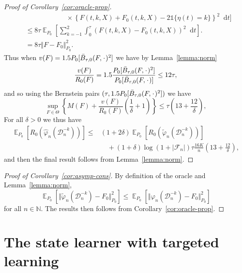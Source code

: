 \documentclass{statsoc}
\DeclareMathOperator{\E}{\mathbb{E}} %
\newcommand{\N}{\mathbb{N}}
\newcommand{\blank}{\makebox[1ex]{\textbf{$\cdot$}}}
\renewcommand{\phi}{\varphi}
\newcommand*\diff{\mathop{}\!\mathrm{d}}
\newcommand{\1}{\mathds{1}}
\newcommand{\data}{\ensuremath{\mathcal{D}}}
\begin{document}
\begin{proof}[Proof of Corollary~\ref{cor:oracle-prop}]
\begin{align*}
  & \quad \quad \quad\quad \quad \quad \times
    \left\{
    F(t, k, X) +  F_0(t, k, X)-2 \1{\{\eta(t) = k\}}
    \right\}^2
    \diff t 
    \Bigg]
  \\
  & \leq
    8\tau \E_{P_0}{\left[
    \sum_{k=-1}^{2} \int_0^{\tau}
    \left(
    F(t, k, X) - F_0(t, k, X)
    \right)^2
    \diff t 
    \right]}.
  \\
  & =
    8\tau \Vert F - F_0 \Vert_{P_0}^2.
\end{align*}
Thus when \( v(F) = 1.5 P_0{[\bar{B}_{\tau,0}(F, \blank)^2]} \) we have by
Lemma~\ref{lemma:norm}
\begin{equation*}
  \frac{v(F)}{R_0(F)}
  = 1.5 \frac{P_0{[\bar{B}_{\tau,0}(F, \blank)^2]}}{P_0{[\bar{B}_{\tau,0}(F, \blank)]}}
  \leq 12 \tau,
\end{equation*}
and so using the Bernstein pairs \( (\tau, 1.5 P_0{[\bar{B}_{\tau,0}(F, \blank)^2]}) \) we have
\begin{equation*}
  \sup_{F \in \Theta}
  \left\{
    M(F) + \frac{v(F)}{R_0(F)}
    \left(
      \frac{1}{\delta} + 1
    \right)
  \right\}
  \leq \tau
  \left(
    13 + \frac{12}{\delta}
  \right),
\end{equation*}
For all $\delta>0$ we thus have
\begin{align*}
  \E_{P_0}{\left[ R_0(\hat{\phi}_n(\data_n^{-k})) \right]}
  \leq
  &(1+2\delta)\E_{P_0}{\left[ R_0(\tilde{\phi}_n(\data_n^{-k})) \right]}
  \\
  & \quad
    + (1+\delta)\log(1 + |\mathcal{F}_n|) \tau \frac{16 K}{n}
    \left(
    13 + \frac{12}{\delta}
    \right),
\end{align*}
and then the final result follows from Lemma~\ref{lemma:norm}.
\end{proof}

\begin{proof}[Proof of Corollary~\ref{cor:asymp-cons}]
  By definition of the oracle and Lemma~\ref{lemma:norm},
  \begin{equation*}
    \E_{P_0}{\left[ \Vert \tilde{\phi}_n(\data_n^{-k}) - F_0 \Vert_{P_0}^2
      \right]} \leq \E_{P_0}{\left[ \Vert \phi_n(\data_n^{-k}) - F_0 \Vert_{P_0}^2
      \right]}  
  \end{equation*}
  for all \( n \in \N \). The results then follows from
  Corollary~\ref{cor:oracle-prop}.
\end{proof}


\section{The state learner with targeted learning}
\label{sec:state-learner-with}
\end{document}
